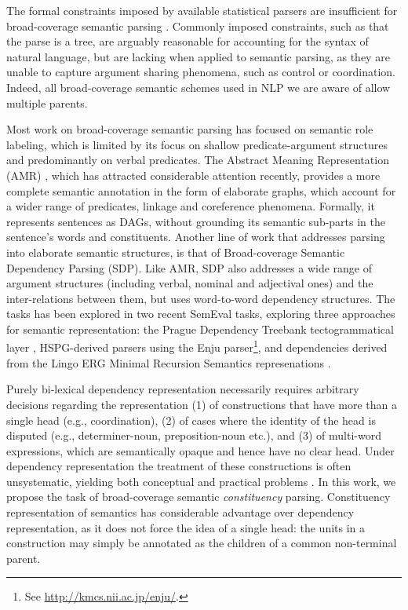 \documentclass[11pt]{article}
\begin{document}

The formal constraints imposed by available statistical parsers are insufficient for
broad-coverage semantic parsing \cite{oepen2015semeval}.
Commonly imposed constraints, such as that the parse is a tree, are arguably reasonable for
accounting for the syntax of natural language, but are lacking when applied to semantic parsing,
as they are unable to capture argument sharing phenomena, such as control or coordination.
Indeed, all broad-coverage semantic schemes used in NLP we are aware of allow multiple parents.

Most work on broad-coverage semantic parsing has focused on semantic role labeling,
which is limited by its focus on shallow predicate-argument structures and predominantly on verbal
predicates. The Abstract Meaning Representation (AMR) \cite{banarescu2013abstract},
which has attracted considerable attention recently,
provides a more complete semantic annotation in the form of elaborate graphs,
which account for a wider range of predicates, linkage and coreference phenomena.
Formally, it represents sentences as DAGs, without grounding its
semantic sub-parts in the sentence's words and constituents.
Another line of work that addresses parsing into elaborate semantic structures,
is that of Broad-coverage Semantic Dependency Parsing \cite{oepen2014semeval,oepen2015semeval} (SDP).
Like AMR, SDP also addresses a wide range of argument structures (including verbal, nominal and adjectival ones)
and the inter-relations between them, but uses word-to-word dependency structures.
The tasks has been explored in two recent SemEval tasks, exploring three approaches
for semantic representation: the Prague
Dependency Treebank tectogrammatical layer \cite{bohmova2003prague},
HSPG-derived parsers using the Enju parser\footnote{See \url{http://kmcs.nii.ac.jp/enju/}.},
and dependencies derived from the Lingo ERG
Minimal Recursion Semantics represenations \cite{Flic:02}.

Purely bi-lexical dependency representation necessarily requires arbitrary decisions regarding the representation (1) of constructions that have more than a single
head (e.g., coordination), (2) of cases where the identity of the head is disputed
(e.g., determiner-noun, preposition-noun etc.), and (3) of multi-word expressions,
which are semantically opaque and hence have no clear head. Under dependency representation
the treatment of these constructions is often unsystematic, yielding both conceptual
and practical problems \cite{schwartz2011neutralizing,Ivanova2012who,tsarfaty2012cross}.
In this work, we propose the task of broad-coverage semantic {\it constituency} parsing. 
Constituency representation of semantics has considerable advantage over dependency representation, as it does not force the idea of a single head: the units in a construction may simply be annotated as the children of a common non-terminal parent.
\end{document}
